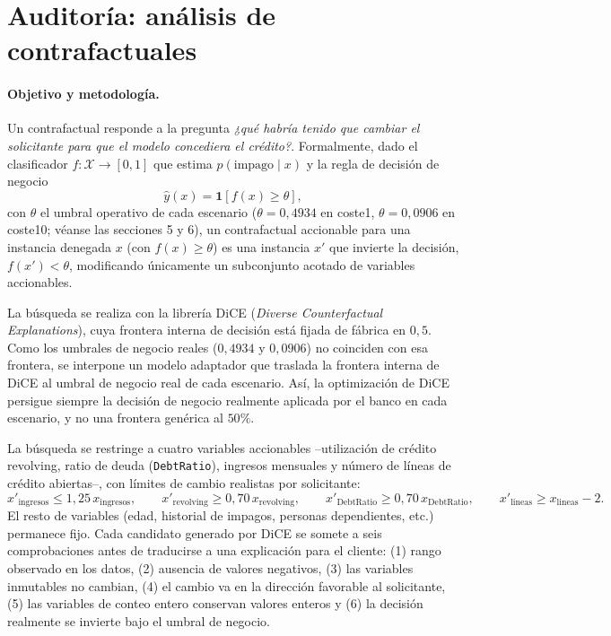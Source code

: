 \documentclass[11pt,a4paper]{article}
\begin{document}
\section{Auditoría: análisis de contrafactuales}

\paragraph{Objetivo y metodología.} Un contrafactual responde a la pregunta \emph{¿qué habría tenido que cambiar el solicitante para que el modelo concediera el crédito?}. Formalmente, dado el clasificador $f:\mathcal{X}\rightarrow[0,1]$ que estima $p(\text{impago}\mid x)$ y la regla de decisión de negocio
\[
\hat{y}(x) = \mathbf{1}\left[f(x) \geq \theta\right],
\]
con $\theta$ el umbral operativo de cada escenario ($\theta=0{,}4934$ en coste1, $\theta=0{,}0906$ en coste10; véanse las secciones 5 y 6), un contrafactual accionable para una instancia denegada $x$ (con $f(x)\geq\theta$) es una instancia $x'$ que invierte la decisión, $f(x') < \theta$, modificando únicamente un subconjunto acotado de variables accionables.

La búsqueda se realiza con la librería DiCE (\emph{Diverse Counterfactual Explanations}), cuya frontera interna de decisión está fijada de fábrica en $0{,}5$. Como los umbrales de negocio reales ($0{,}4934$ y $0{,}0906$) no coinciden con esa frontera, se interpone un modelo adaptador que traslada la frontera interna de DiCE al umbral de negocio real de cada escenario. Así, la optimización de DiCE persigue siempre la decisión de negocio realmente aplicada por el banco en cada escenario, y no una frontera genérica al $50\%$.

La búsqueda se restringe a cuatro variables accionables --utilización de crédito revolving, ratio de deuda (\texttt{DebtRatio}), ingresos mensuales y número de líneas de crédito abiertas--, con límites de cambio realistas por solicitante:
\[
x'_{\text{ingresos}} \leq 1{,}25\, x_{\text{ingresos}}, \qquad
x'_{\text{revolving}} \geq 0{,}70\, x_{\text{revolving}}, \qquad
x'_{\text{DebtRatio}} \geq 0{,}70\, x_{\text{DebtRatio}}, \qquad
x'_{\text{lineas}} \geq x_{\text{lineas}} - 2 .
\]
El resto de variables (edad, historial de impagos, personas dependientes, etc.) permanece fijo. Cada candidato generado por DiCE se somete a seis comprobaciones antes de traducirse a una explicación para el cliente: (1) rango observado en los datos, (2) ausencia de valores negativos, (3) las variables inmutables no cambian, (4) el cambio va en la dirección favorable al solicitante, (5) las variables de conteo entero conservan valores enteros y (6) la decisión realmente se invierte bajo el umbral de negocio.
\end{document}
